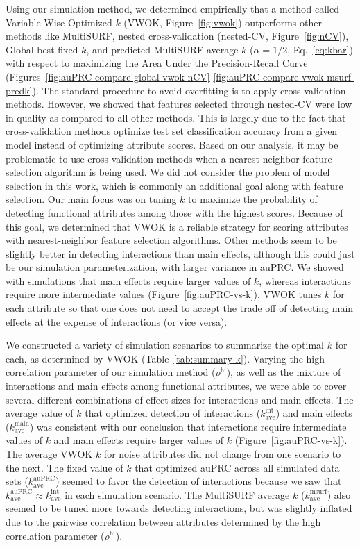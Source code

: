\documentclass[10pt,letterpaper]{article}
\begin{document}
Using our simulation method, we determined empirically that a method called Variable-Wise Optimized $k$ (VWOK, Figure~\ref{fig:vwok}) outperforms other methods like MultiSURF, nested cross-validation (nested-CV, Figure~\ref{fig:nCV}), Global best fixed $k$, and predicted MultiSURF average $k$ ($\alpha=1/2$, Eq.~\ref{eq:kbar}) with respect to maximizing the Area Under the Precision-Recall Curve (Figures~\ref{fig:auPRC-compare-global-vwok-nCV}-\ref{fig:auPRC-compare-vwok-msurf-predk}). The standard procedure to avoid overfitting is to apply cross-validation methods. However, we showed that features selected through nested-CV were low in quality as compared to all other methods. This is largely due to the fact that cross-validation methods optimize test set classification accuracy from a given model instead of optimizing attribute scores. Based on our analysis, it may be problematic to use cross-validation methods when a nearest-neighbor feature selection algorithm is being used. We did not consider the problem of model selection in this work, which is commonly an additional goal along with feature selection. Our main focus was on tuning $k$ to maximize the probability of detecting functional attributes among those with the highest scores. Because of this goal, we determined that VWOK is a reliable strategy for scoring attributes with nearest-neighbor feature selection algorithms. Other methods seem to be slightly better in detecting interactions than main effects, although this could just be our simulation parameterization, with larger variance in auPRC. We showed with simulations that main effects require larger values of $k$, whereas interactions require more intermediate values (Figure~\ref{fig:auPRC-vs-k}). VWOK tunes $k$ for each attribute so that one does not need to accept the trade off of detecting main effects at the expense of interactions (or vice versa). 

We constructed a variety of simulation scenarios to summarize the optimal $k$ for each, as determined by VWOK (Table~\ref{tab:summary-k}). Varying the high correlation parameter of our simulation method ($\rho^\text{hi}$), as well as the mixture of interactions and main effects among functional attributes, we were able to cover several different combinations of effect sizes for interactions and main effects. The average value of $k$ that optimized detection of interactions ($k^\text{int}_\text{ave}$) and main effects ($k^\text{main}_\text{ave}$) was consistent with our conclusion that interactions require intermediate values of $k$ and main effects require larger values of $k$ (Figure~\ref{fig:auPRC-vs-k}). The average VWOK $k$ for noise attributes did not change from one scenario to the next. The fixed value of $k$ that optimized auPRC across all simulated data sets ($k^\text{auPRC}_\text{ave}$) seemed to favor the detection of interactions because we saw that $k^\text{auPRC}_\text{ave} \approx k^\text{int}_\text{ave}$ in each simulation scenario. The MultiSURF average $k$ ($k^\text{msurf}_\text{ave}$) also seemed to be tuned more towards detecting interactions, but was slightly inflated due to the pairwise correlation between attributes determined by the high correlation parameter ($\rho^\text{hi}$).
\end{document}
